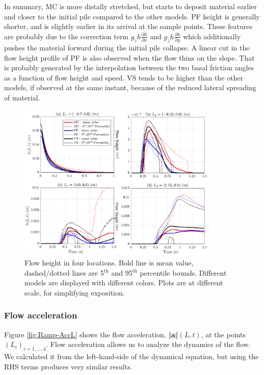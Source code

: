 \documentclass{article}
\begin{document}
In summary, MC is more distally stretched, but starts to deposit material earlier and closer to the initial pile compared to the other models. PF height is generally shorter, and is slightly earlier in its arrival at the sample points. These features are probably due to the correction term $g_z h \frac{\partial h}{\partial x}$ and $g_z h \frac{\partial h}{\partial y}$ which additionally pushes the material forward during the initial pile collapse. A linear cut in the flow height profile of PF is also observed when the flow thins on the slope. That is probably generated by the interpolation between the two basal friction angles as a function of flow height and speed. VS tends to be higher than the other models, if observed at the same instant, because of the reduced lateral spreading of material.
\begin{figure}[H]
         \centering
        \includegraphics[width=0.85\textwidth]{figures/incline/Height.png}
        \caption{Flow height in four locations. Bold line is mean value, dashed/dotted lines are 5$^{\mathrm{th}}$ and 95$^{\mathrm{th}}$ percentile bounds. Different models are displayed with different colors. Plots are at different scale, for simplifying exposition.}
        \label{fig:Ramp-H}
\end{figure}
\subsubsection{Flow acceleration}
Figure \ref{fig:Ramp-AccL} shows the flow acceleration, $\Vert \underline{\mathbf{a}} \Vert(L,t)$, at the points $(L_i)_{i=1,\dots,4}$. Flow acceleration allows us to analyze the dynamics of the flow. We calculated it from the left-hand-side of the dynamical equation, but using the RHS terms produces very similar results.
\end{document}
